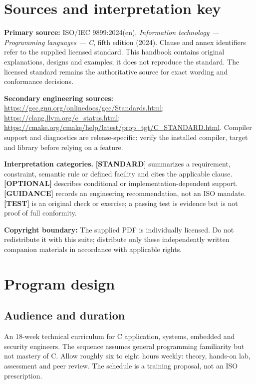 \documentclass[10pt,letterpaper,oneside]{report}
\begin{document}
\chapter*{Sources and interpretation key}
\textbf{Primary source:} ISO/IEC 9899:2024(en), \emph{Information technology --- Programming languages --- C}, fifth edition (2024). Clause and annex identifiers refer to the supplied licensed standard. This handbook contains original explanations, designs and examples; it does not reproduce the standard. The licensed standard remains the authoritative source for exact wording and conformance decisions.\par
\textbf{Secondary engineering sources:} \url{https://gcc.gnu.org/onlinedocs/gcc/Standards.html}; \url{https://clang.llvm.org/c_status.html}; \url{https://cmake.org/cmake/help/latest/prop_tgt/C_STANDARD.html}. Compiler support and diagnostics are release-specific: verify the installed compiler, target and library before relying on a feature.\par
\begin{keybox}\textbf{Interpretation categories.} \textbf{[STANDARD]} summarizes a requirement, constraint, semantic rule or defined facility and cites the applicable clause. \textbf{[OPTIONAL]} describes conditional or implementation-dependent support. \textbf{[GUIDANCE]} records an engineering recommendation, not an ISO mandate. \textbf{[TEST]} is an original check or exercise; a passing test is evidence but is not proof of full conformity.\end{keybox}
\textbf{Copyright boundary:} The supplied PDF is individually licensed. Do not redistribute it with this suite; distribute only these independently written companion materials in accordance with applicable rights.\par


\chapter{Program design}
\section{Audience and duration}
An 18-week technical curriculum for C application, systems, embedded and security engineers. The sequence assumes general programming familiarity but not mastery of C. Allow roughly six to eight hours weekly: theory, hands-on lab, assessment and peer review. The schedule is a training proposal, not an ISO prescription.
\end{document}

